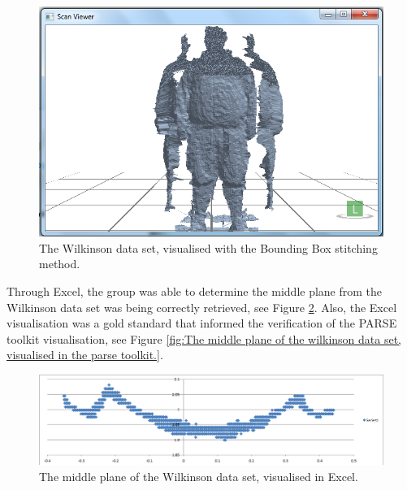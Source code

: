\begin{figure}[!htb]
\begin{center}
\includegraphics[scale=0.4]{images/wilko1} 
\end{center}
\caption{The Wilkinson data set, visualised with the Bounding Box stitching method.}
\label{fig:the wilkinson data set, visualised with the bounding box stitching method}
\end{figure}

Through Excel, the group was able to determine the middle plane from the Wilkinson data set was being correctly retrieved, see Figure \ref{fig:the middle plane of the Wilkinson data set, visualised in excel.}. Also, the Excel visualisation was a gold standard that informed the verification of the PARSE toolkit visualisation, see Figure \ref{fig:The middle plane of the wilkinson data set, visualised in the parse toolkit.}.\\ 

\begin{figure}[!htb]
\begin{center}
\includegraphics[scale=0.4]{images/wilko2} 
\end{center}
\caption{The middle plane of the Wilkinson data set, visualised in Excel.}
\label{fig:the middle plane of the Wilkinson data set, visualised in excel.}
\end{figure}

